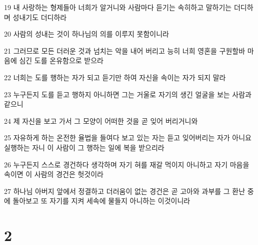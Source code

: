 \par 19 내 사랑하는 형제들아 너희가 알거니와 사람마다 듣기는 속히하고 말하기는 더디하며 성내기도 더디하라
\par 20 사람의 성내는 것이 하나님의 의를 이루지 못함이니라
\par 21 그러므로 모든 더러운 것과 넘치는 악을 내어 버리고 능히 너희 영혼을 구원할바 마음에 심긴 도를 온유함으로 받으라
\par 22 너희는 도를 행하는 자가 되고 듣기만 하여 자신을 속이는 자가 되지 말라
\par 23 누구든지 도를 듣고 행하지 아니하면 그는 거울로 자기의 생긴 얼굴을 보는 사람과 같으니
\par 24 제 자신을 보고 가서 그 모양이 어떠한 것을 곧 잊어 버리거니와
\par 25 자유하게 하는 온전한 율법을 들여다 보고 있는 자는 듣고 잊어버리는 자가 아니요 실행하는 자니 이 사람이 그 행하는 일에 복을 받으리라
\par 26 누구든지 스스로 경건하다 생각하며 자기 혀를 재갈 먹이지 아니하고 자기 마음을 속이면 이 사람의 경건은 헛것이라
\par 27 하나님 아버지 앞에서 정결하고 더러움이 없는 경건은 곧 고아와 과부를 그 환난 중에 돌아보고 또 자기를 지켜 세속에 물들지 아니하는 이것이니라

\chapter{2}

